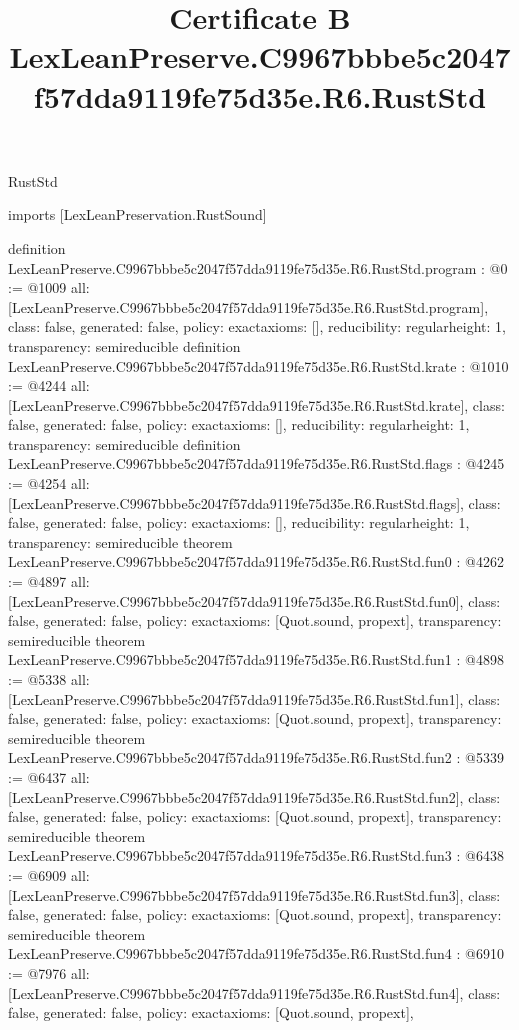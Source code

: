 \begin{lexlean}{RustStd}
\title{Certificate B LexLeanPreserve.C9967bbbe5c2047f57dda9119fe75d35e.R6.RustStd}
\begin{coremodule}
imports [LexLeanPreservation.RustSound]

definition LexLeanPreserve.C9967bbbe5c2047f57dda9119fe75d35e.R6.RustStd.program : @0 := @1009 {
  all: [LexLeanPreserve.C9967bbbe5c2047f57dda9119fe75d35e.R6.RustStd.program],
  class: false,
  generated: false,
  policy: exact{axioms: []},
  reducibility: regular{height: 1},
  transparency: semireducible
}
definition LexLeanPreserve.C9967bbbe5c2047f57dda9119fe75d35e.R6.RustStd.krate : @1010 := @4244 {
  all: [LexLeanPreserve.C9967bbbe5c2047f57dda9119fe75d35e.R6.RustStd.krate],
  class: false,
  generated: false,
  policy: exact{axioms: []},
  reducibility: regular{height: 1},
  transparency: semireducible
}
definition LexLeanPreserve.C9967bbbe5c2047f57dda9119fe75d35e.R6.RustStd.flags : @4245 := @4254 {
  all: [LexLeanPreserve.C9967bbbe5c2047f57dda9119fe75d35e.R6.RustStd.flags],
  class: false,
  generated: false,
  policy: exact{axioms: []},
  reducibility: regular{height: 1},
  transparency: semireducible
}
theorem LexLeanPreserve.C9967bbbe5c2047f57dda9119fe75d35e.R6.RustStd.fun0 : @4262 := @4897 {
  all: [LexLeanPreserve.C9967bbbe5c2047f57dda9119fe75d35e.R6.RustStd.fun0],
  class: false,
  generated: false,
  policy: exact{axioms: [Quot.sound, propext]},
  transparency: semireducible
}
theorem LexLeanPreserve.C9967bbbe5c2047f57dda9119fe75d35e.R6.RustStd.fun1 : @4898 := @5338 {
  all: [LexLeanPreserve.C9967bbbe5c2047f57dda9119fe75d35e.R6.RustStd.fun1],
  class: false,
  generated: false,
  policy: exact{axioms: [Quot.sound, propext]},
  transparency: semireducible
}
theorem LexLeanPreserve.C9967bbbe5c2047f57dda9119fe75d35e.R6.RustStd.fun2 : @5339 := @6437 {
  all: [LexLeanPreserve.C9967bbbe5c2047f57dda9119fe75d35e.R6.RustStd.fun2],
  class: false,
  generated: false,
  policy: exact{axioms: [Quot.sound, propext]},
  transparency: semireducible
}
theorem LexLeanPreserve.C9967bbbe5c2047f57dda9119fe75d35e.R6.RustStd.fun3 : @6438 := @6909 {
  all: [LexLeanPreserve.C9967bbbe5c2047f57dda9119fe75d35e.R6.RustStd.fun3],
  class: false,
  generated: false,
  policy: exact{axioms: [Quot.sound, propext]},
  transparency: semireducible
}
theorem LexLeanPreserve.C9967bbbe5c2047f57dda9119fe75d35e.R6.RustStd.fun4 : @6910 := @7976 {
  all: [LexLeanPreserve.C9967bbbe5c2047f57dda9119fe75d35e.R6.RustStd.fun4],
  class: false,
  generated: false,
  policy: exact{axioms: [Quot.sound, propext]},
}
\end{coremodule}
\end{lexlean}
